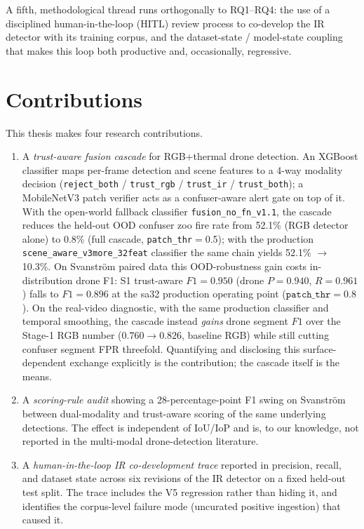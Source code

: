 \documentclass[12pt,a4paper,oneside,openright]{book}
\begin{document}
A fifth, methodological thread runs orthogonally to RQ1--RQ4: the use of a disciplined human-in-the-loop (HITL) review process to co-develop the IR detector with its training corpus, and the dataset-state / model-state coupling that makes this loop both productive and, occasionally, regressive.

\section{Contributions}

This thesis makes four research contributions.

\begin{enumerate}
    \item A \emph{trust-aware fusion cascade} for RGB+thermal drone detection. An XGBoost classifier maps per-frame detection and scene features to a 4-way modality decision (\texttt{reject\_both} / \texttt{trust\_rgb} / \texttt{trust\_ir} / \texttt{trust\_both}); a MobileNetV3 patch verifier acts as a confuser-aware alert gate on top of it. With the open-world fallback classifier \texttt{fusion\_no\_fn\_v1.1}, the cascade reduces the held-out OOD confuser zoo fire rate from 52.1\% (RGB detector alone) to 0.8\% (full cascade, \texttt{patch\_thr}$=$0.5); with the production \texttt{scene\_aware\_v3more\_32feat} classifier the same chain yields 52.1\% $\to$ 10.3\%. On Svanstr\"om paired data this OOD-robustness gain costs in-distribution drone F1: S1 trust-aware $F1=0.950$ (drone $P=0.940$, $R=0.961$) falls to $F1=0.896$ at the sa32 production operating point ($\mathtt{patch\_thr}=0.8$). On the real-video diagnostic, with the same production classifier and temporal smoothing, the cascade instead \emph{gains} drone segment $F1$ over the Stage-1 RGB number ($0.760 \to 0.826$, baseline RGB) while still cutting confuser segment FPR threefold. Quantifying and disclosing this surface-dependent exchange explicitly is the contribution; the cascade itself is the means.
    \item A \emph{scoring-rule audit} showing a 28-percentage-point F1 swing on Svanstr\"om between dual-modality and trust-aware scoring of the same underlying detections. The effect is independent of IoU/IoP and is, to our knowledge, not reported in the multi-modal drone-detection literature.
    \item A \emph{human-in-the-loop IR co-development trace} reported in precision, recall, and dataset state across six revisions of the IR detector on a fixed held-out test split. The trace includes the V5 regression rather than hiding it, and identifies the corpus-level failure mode (uncurated positive ingestion) that caused it.

\end{enumerate}
\end{document}
